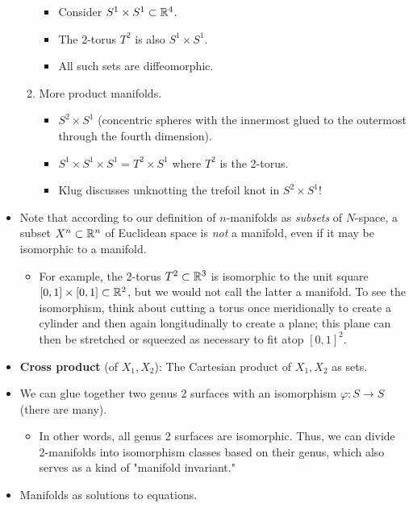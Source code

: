 \documentclass[../notes.tex]{subfiles}
\begin{document}
\begin{itemize}
\begin{enumerate}
        \begin{itemize}
            \item Consider $S^1\times S^1\subset\mathbb{R}^4$.
            \item The 2-torus $T^2$ is also $S^1\times S^1$.
            \item All such sets are diffeomorphic.
        \end{itemize}
        \item More product manifolds.
        \begin{itemize}
            \item $S^2\times S^1$ (concentric spheres with the innermost glued to the outermost through the fourth dimension).
            \item $S^1\times S^1\times S^1=T^2\times S^1$ where $T^2$ is the 2-torus.
            \item Klug discusses unknotting the trefoil knot in $S^2\times S^1$!
        \end{itemize}
    \end{enumerate}
    \item Note that according to our definition of $n$-manifolds as \emph{subsets} of $N$-space, a subset $X^n\subset\mathbb{R}^n$ of Euclidean space is \emph{not} a manifold, even if it may be isomorphic to a manifold.
    \begin{itemize}
        \item For example, the 2-torus $T^2\subset\mathbb{R}^3$ is isomorphic to the unit square $[0,1]\times[0,1]\subset\mathbb{R}^2$, but we would not call the latter a manifold. To see the isomorphism, think about cutting a torus once meridionally to create a cylinder and then again longitudinally to create a plane; this plane can then be stretched or squeezed as necessary to fit atop $[0,1]^2$.
    \end{itemize}
    \item \textbf{Cross product} (of $X_1,X_2$): The Cartesian product of $X_1,X_2$ as sets.
    \item We can glue together two genus 2 surfaces with an isomorphism $\varphi:S\to S$ (there are many).
    \begin{itemize}
        \item In other words, all genus 2 surfaces are isomorphic. Thus, we can divide 2-manifolds into isomorphism classes based on their genus, which also serves as a kind of "manifold invariant."
    \end{itemize}
    \item Manifolds as solutions to equations.

\end{itemize}
\end{document}
